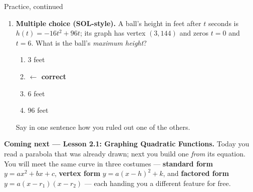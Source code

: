 \documentclass[12pt]{article}
\begin{document}
\begin{notesbox}{Practice, continued}
\begin{enumerate}[leftmargin=1.9em, itemsep=7pt, start=4]
  \item \textbf{Multiple choice (SOL-style).} A ball's height in feet after $t$ seconds is
        $h(t)=-16t^2+96t$; its graph has vertex $(3,144)$ and zeros $t=0$ and $t=6$. What is the
        ball's \emph{maximum height}?
    \begin{enumerate}[label=\Alph*., leftmargin=2.2em, itemsep=0pt, topsep=2pt]
      \item {}$3$ feet
      \item {} \hfill \textcolor{keyred}{\textbf{$\leftarrow$ correct}}
      \item $6$ feet
      \item $96$ feet
    \end{enumerate}
    Say in one sentence how you ruled out one of the others.
\end{enumerate}
\end{notesbox}

\vspace{0.08in}

\boxguard[8]
\begin{spiralbox}
\small
\textbf{Coming next --- Lesson 2.1: Graphing Quadratic Functions.} Today you read a parabola that
was already drawn; next you build one \emph{from} its equation. You will meet the same curve in
three costumes --- \textbf{standard form} $y=ax^2+bx+c$, \textbf{vertex form} $y=a(x-h)^2+k$, and
\textbf{factored form} $y=a(x-r_1)(x-r_2)$ --- each handing you a different feature for free.
\end{spiralbox}
\end{document}
